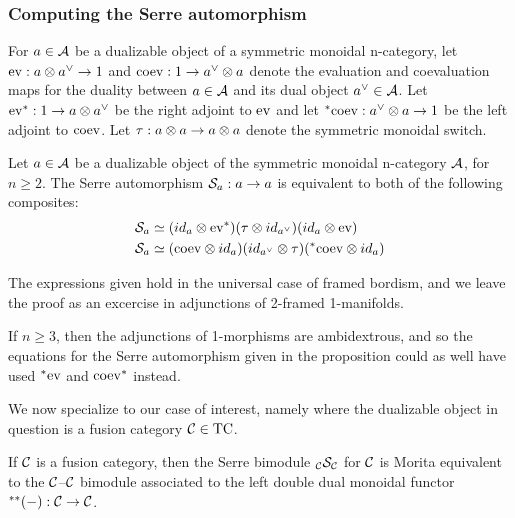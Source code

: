 \documentclass{amsart}
\begin{document}
\subsubsection{Computing the Serre automorphism} \label{sec-serre-comp}


For $a \in \mathcal A$ be a dualizable object of a symmetric monoidal n-category, let $\mathrm{ev} : a \otimes a^{\vee} \rightarrow 1$ and $\mathrm{coev}: 1 \rightarrow a^{\vee} \otimes a$ denote the evaluation and coevaluation maps for the duality between $a \in \mathcal A$ and its dual object $a^{\vee} \in \mathcal A$.  Let ${\mathrm{ev}}^*: 1 \rightarrow a \otimes a^{\vee}$ be the right adjoint to $\mathrm{ev}$ and let ${}^*{\mathrm{coev}}: a^{\vee} \otimes a \rightarrow 1$ be the left adjoint to $\mathrm{coev}$.  Let $\tau: a \otimes a \rightarrow a \otimes a$ denote the symmetric monoidal switch.

\begin{proposition} \label{prop-serrecomp}
Let $a \in \mathcal A$ be a dualizable object of the symmetric monoidal n-category $\mathcal A$, for $n \geq 2$.  The Serre automorphism $\mathcal S_a : a \rightarrow a$ is equivalent to both of the following composites:
\begin{align}
\mathcal S_a & \simeq ({id}_a \otimes {\mathrm{ev}}^*) (\tau \otimes {id}_{a^{\vee}}) ({id}_a \otimes \mathrm{ev}) \nonumber\\
\mathcal S_a & \simeq (\mathrm{coev} \otimes {id}_a) ({id}_{a^{\vee}} \otimes \tau) ({}^*{\mathrm{coev}} \otimes {id}_a) \nonumber
\end{align}
\end{proposition}

The expressions given hold in the universal case of framed bordism, and we leave the proof as an excercise in adjunctions of 2-framed 1-manifolds.

\begin{remark}
If $n \geq 3$, then the adjunctions of 1-morphisms are ambidextrous, and so the equations for the Serre automorphism given in the proposition could as well have used ${}^*{\mathrm{ev}}$ and ${\mathrm{coev}}^*$ instead.
\end{remark}


We now specialize to our case of interest, namely where the dualizable object in question is a fusion category $\mathcal C \in \mathrm{TC}$.


\begin{theorem} \label{thm-serre}
If $\mathcal C$ is a fusion category, then the Serre bimodule ${}_{\mathcal C} {\mathcal S}_{\mathcal C}$ for $\mathcal C$ is Morita equivalent to the $\mathcal C$--$\mathcal C$ bimodule associated to the left double dual monoidal functor ${}^{**}{(-)}: \mathcal C \rightarrow \mathcal C$.
\end{theorem}
\end{document}
